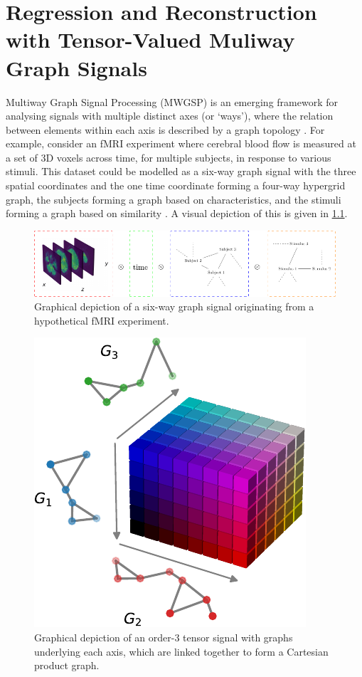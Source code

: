 

\chapter{Regression and Reconstruction with Tensor-Valued
Muliway Graph Signals}


\label{chap:nd_gsp}


Multiway Graph Signal Processing (MWGSP) is an emerging framework for analysing signals with multiple distinct axes (or `ways'), where the relation between elements within each axis is described by a graph topology \citep{Stanley2020}. For example, consider an fMRI experiment where cerebral blood flow is measured at a set of 3D voxels across time, for multiple subjects, in response to various stimuli. This dataset could be modelled as a six-way graph signal with the three spatial coordinates and the one time coordinate forming a four-way hypergrid graph, the subjects forming a graph based on characteristics, and the stimuli forming a graph based on similarity \citep{Cichocki2015}. A visual depiction of this is given in \cref{fig:fMRI_diagram}. 
 
\vspace{1.5cm}

\begin{figure}[h] 
    \begin{center}
        \includegraphics[width=\linewidth]{Figures/fMRI_Digaram.pdf}
    \end{center}
   \caption[Graphical depiction of an order-3 tensor]{Graphical depiction of a six-way graph signal originating from a hypothetical fMRI experiment. } 
    \label{fig:fMRI_diagram}
\end{figure} 


\begin{figure}[b] 
    \begin{center}
        \includegraphics[width=0.4\linewidth]{Figures/coloured_tensor.pdf}
    \end{center}
   \caption[Graphical depiction of an order-3 tensor]{Graphical depiction of an order-3 tensor signal with graphs underlying each axis, which are linked together to form a Cartesian product graph.} 
    \label{fig:coloured_tensor}
\end{figure}  

